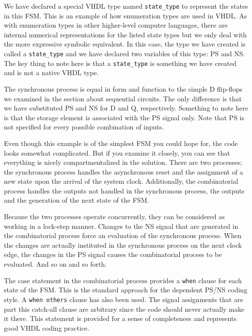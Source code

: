 \begin{my_list}
\item We have declared a special VHDL type named \texttt{state\_type} to represent the states in this FSM. This is an example of how enumeration types are used in VHDL. As with enumeration types in other higher-level computer languages, there are internal numerical representations for the listed state types but we only deal with the more expressive symbolic equivalent. In this case, the type we have created is called a \texttt{state\_type} and we have declared two variables of this type: PS and NS. The key thing to note here is that a \texttt{state\_type} is something we have created and is not a native VHDL type.

\item The synchronous process is equal in form and function to the simple D flip-flops we examined in the section about sequential circuits. The only difference is that we have substituted PS and NS for D and Q, respectively. Something to note here is that the storage element is associated with the PS signal only. Note that PS is not specified for every possible combination of inputs. 

\item Even though this example is of the simplest FSM you could hope for, the code looks somewhat complicated. But if you examine it closely, you can see that everything is nicely compartmentalized in the solution. There are two processes; the synchronous process handles the asynchronous reset and the assignment of a new state upon the arrival of the system clock. Additionally, the combinatorial process handles the outputs not handled in the synchronous process, the outputs and the generation of the next state of the FSM. 

\item Because the two processes operate concurrently, they can be considered as working in a lock-step manner. Changes to the NS signal that are generated in the combinatorial process force an evaluation of the synchronous process. When the changes are actually instituted in the synchronous process on the next clock edge, the changes in the PS signal causes the combinatorial process to be evaluated. And so on and so forth. 

\item The case statement in the combinatorial process provides a \texttt{when} clause for each state of the FSM. This is the standard approach for the dependent PS/NS coding style. A \texttt{when others} clause has also been used. The signal assignments that are part this catch-all clause are arbitrary since the code should never actually make it there. This statement is provided for a sense of completeness and represents good VHDL coding practice. 


\end{my_list}
